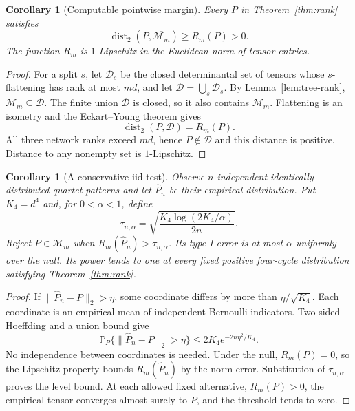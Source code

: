 \documentclass[11pt]{article}
\newtheorem{corollary}[theorem]{Corollary}
\theoremstyle{definition}
\theoremstyle{remark}
\DeclareMathOperator{\dist}{dist}
\newcommand{\Prob}{\mathbb P}
\begin{document}
\begin{corollary}[Computable pointwise margin]\label{cor:residual}
Every $P$ in Theorem~\ref{thm:rank} satisfies
\[
 \dist_2(P,\overline{\mathcal M_m})\ge R_m(P)>0.
\]
The function $R_m$ is $1$-Lipschitz in the Euclidean norm of tensor entries.
\end{corollary}
\begin{proof}
For a split $s$, let $\mathcal D_s$ be the closed determinantal set of
tensors whose $s$-flattening has rank at most $md$, and let
$\mathcal D=\bigcup_s\mathcal D_s$. By Lemma~\ref{lem:tree-rank},
$\mathcal M_m\subseteq\mathcal D$. The finite union $\mathcal D$ is
closed, so it also contains $\overline{\mathcal M_m}$.
Flattening is an isometry and the Eckart--Young theorem gives
\[
 \dist_2(P,\mathcal D)=R_m(P).
\]
All three network ranks exceed $md$, hence $P\notin\mathcal D$ and this
distance is positive. Distance to any nonempty set is $1$-Lipschitz.
\end{proof}

\begin{corollary}[A conservative iid test]\label{cor:test}
Observe $n$ independent identically distributed quartet patterns and let
$\widehat P_n$ be their empirical distribution. Put $K_4=d^4$ and, for
$0<\alpha<1$, define
\[
 \tau_{n,\alpha}=\sqrt{\frac{K_4\log(2K_4/\alpha)}{2n}}.
\]
Reject $P\in\overline{\mathcal M_m}$ when
$R_m(\widehat P_n)>\tau_{n,\alpha}$. Its type-I error is at most
$\alpha$ uniformly over the null. Its power tends to one at every fixed
positive four-cycle distribution satisfying Theorem~\ref{thm:rank}.
\end{corollary}
\begin{proof}
If $\|\widehat P_n-P\|_2>\eta$, some coordinate differs by more than
$\eta/\sqrt{K_4}$. Each coordinate is an empirical mean of independent
Bernoulli indicators. Two-sided Hoeffding \cite{Hoeffding1963} and a union
bound give
\begin{equation}\label{eq:coordinate-hoeffding}
 \Prob_P\{\|\widehat P_n-P\|_2>\eta\}
       \le2K_4e^{-2n\eta^2/K_4}.
\end{equation}
No independence between coordinates is needed. Under the null,
$R_m(P)=0$, so the Lipschitz property bounds $R_m(\widehat P_n)$ by the
norm error. Substitution of $\tau_{n,\alpha}$ proves the level bound.
At each allowed fixed alternative, $R_m(P)>0$, the empirical tensor
converges almost surely to $P$, and the threshold tends to zero.
\end{proof}
\end{document}
